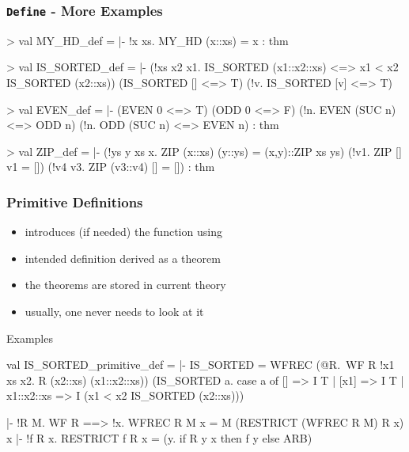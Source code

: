 \begin{frame}[fragile]
\frametitle{\texttt{Define} - More Examples}

\begin{block}{}
\begin{semiverbatim}\scriptsize
> 
val MY_HD_def = |- !x xs. MY_HD (x::xs) = x : thm

> 
val IS_SORTED_def =
   |- (!xs x2 x1. IS_SORTED (x1::x2::xs) <=> x1 < x2 \holAnd{} IS_SORTED (x2::xs)) \holAnd{}
      (IS_SORTED [] <=> T) \holAnd{} (!v. IS_SORTED [v] <=> T)

> 
val EVEN_def =
   |- (EVEN 0 <=> T) \holAnd{} (ODD 0 <=> F) \holAnd{} (!n. EVEN (SUC n) <=> ODD n) \holAnd{}
      (!n. ODD (SUC n) <=> EVEN n) : thm

> 
val ZIP_def =
   |- (!ys y xs x. ZIP (x::xs) (y::ys) = (x,y)::ZIP xs ys) \holAnd{}
      (!v1. ZIP [] v1 = []) \holAnd{} (!v4 v3. ZIP (v3::v4) [] = []) : thm
\end{semiverbatim}
\end{block}             
\end{frame}


\begin{frame}[fragile]
\frametitle{Primitive Definitions}
\begin{itemize}
\item {} introduces (if needed) the function using 
\item intended definition derived as a theorem
\item the theorems are stored in current theory
\item usually, one never needs to look at it
\end{itemize}
\begin{block}{Examples}
\begin{semiverbatim}\scriptsize
val IS_SORTED_primitive_def =
|- IS_SORTED =
   WFREC (@R.\ WF R \holAnd{} !x1 xs x2. R (x2::xs) (x1::x2::xs))
     (\textbsl{}IS_SORTED a.
        case a of
          [] => I T
        | [x1] => I T
        | x1::x2::xs => I (x1 < x2 \holAnd{} IS_SORTED (x2::xs)))

|- !R M. WF R ==> !x. WFREC R M x = M (RESTRICT (WFREC R M) R x) x
|- !f R x. RESTRICT f R x = (\textbsl{}y. if R y x then f y else ARB)
\end{semiverbatim}
\end{block}
\end{frame}


